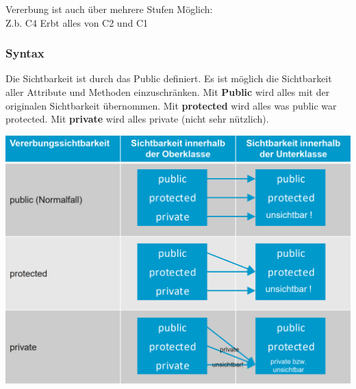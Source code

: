 \noindent
\begin{minipage}{0.6\columnwidth}
\begin{center}
\end{center}
\end{minipage}
\begin{minipage}{0.4\columnwidth}
    Vererbung ist auch über mehrere Stufen Möglich:\\
    Z.b. C4 Erbt alles von C2 und C1
\end{minipage}

\subsubsection{Syntax}



Die Sichtbarkeit ist durch das Public definiert. 
Es ist möglich die Sichtbarkeit aller Attribute und Methoden einzuschränken. 
Mit \textbf{Public} wird alles mit der originalen Sichtbarkeit übernommen. 
Mit \textbf{protected} wird alles was public war protected. 
Mit \textbf{private} wird alles private (nicht sehr nützlich).

\begin{center}
    \includegraphics[width=0.7\columnwidth]{pictures/Vererbung.png}    
\end{center}

